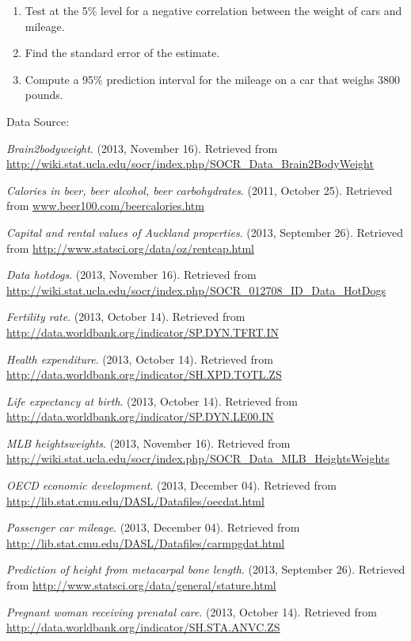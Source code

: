 \documentclass[]{book}
\begin{document}
\begin{enumerate}
\def\labelenumi{\alph{enumi}.}
\item
  Test at the 5\% level for a negative correlation between the weight of cars and mileage.
\item
  Find the standard error of the estimate.
\item
  Compute a 95\% prediction interval for the mileage on a car that weighs 3800 pounds.
\end{enumerate}

Data Source:

\emph{Brain2bodyweight}. (2013, November 16). Retrieved from
\url{http://wiki.stat.ucla.edu/socr/index.php/SOCR_Data_Brain2BodyWeight}

\emph{Calories in beer, beer alcohol, beer carbohydrates}. (2011, October
25). Retrieved from
\href{http://www.beer100.com/beercalories.htm}{www.beer100.com/beercalories.htm}

\emph{Capital and rental values of Auckland properties}. (2013, September
26). Retrieved from \url{http://www.statsci.org/data/oz/rentcap.html}

\emph{Data hotdogs}. (2013, November 16). Retrieved from
\url{http://wiki.stat.ucla.edu/socr/index.php/SOCR_012708_ID_Data_HotDogs}

\emph{Fertility rate}. (2013, October 14). Retrieved from
\url{http://data.worldbank.org/indicator/SP.DYN.TFRT.IN}

\emph{Health expenditure}. (2013, October 14). Retrieved from
\url{http://data.worldbank.org/indicator/SH.XPD.TOTL.ZS}

\emph{Life expectancy at birth}. (2013, October 14). Retrieved from
\url{http://data.worldbank.org/indicator/SP.DYN.LE00.IN}

\emph{MLB heightsweights}. (2013, November 16). Retrieved from
\url{http://wiki.stat.ucla.edu/socr/index.php/SOCR_Data_MLB_HeightsWeights}

\emph{OECD economic development}. (2013, December 04). Retrieved from
\url{http://lib.stat.cmu.edu/DASL/Datafiles/oecdat.html}

\emph{Passenger car mileage}. (2013, December 04). Retrieved from
\url{http://lib.stat.cmu.edu/DASL/Datafiles/carmpgdat.html}

\emph{Prediction of height from metacarpal bone length}. (2013, September
26). Retrieved from \url{http://www.statsci.org/data/general/stature.html}

\emph{Pregnant woman receiving prenatal care}. (2013, October 14). Retrieved
from \url{http://data.worldbank.org/indicator/SH.STA.ANVC.ZS}
\end{document}
